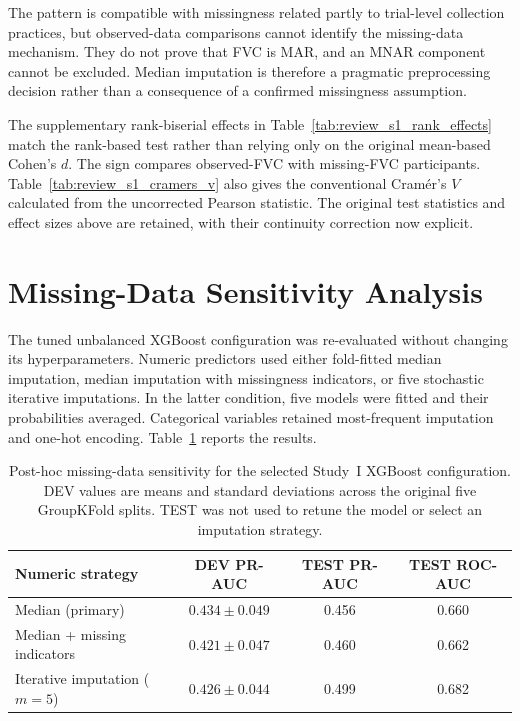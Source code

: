 The pattern is compatible with missingness related partly to trial-level collection practices, but observed-data comparisons cannot identify the missing-data mechanism. They do not prove that FVC is \gls{MAR}, and an \gls{MNAR} component cannot be excluded. Median imputation is therefore a pragmatic preprocessing decision rather than a consequence of a confirmed missingness assumption.

The supplementary rank-biserial effects in Table~\ref{tab:review_s1_rank_effects} match the rank-based test rather than relying only on the original mean-based Cohen's $d$. The sign compares observed-FVC with missing-FVC participants. Table~\ref{tab:review_s1_cramers_v} also gives the conventional Cram\'er's $V$ calculated from the uncorrected Pearson statistic. The original test statistics and effect sizes above are retained, with their continuity correction now explicit.





\section{Missing-Data Sensitivity Analysis}
\label{app:study1_missing_sensitivity}

The tuned unbalanced XGBoost configuration was re-evaluated without changing its hyperparameters. Numeric predictors used either fold-fitted median imputation, median imputation with missingness indicators, or five stochastic iterative imputations. In the latter condition, five models were fitted and their probabilities averaged. Categorical variables retained most-frequent imputation and one-hot encoding. Table~\ref{tab:study1_missing_sensitivity} reports the results.

\begin{table}[ht!]
\centering
\caption[Study I missing-data sensitivity]{Post-hoc missing-data sensitivity for the selected Study~I XGBoost configuration. DEV values are means and standard deviations across the original five GroupKFold splits. TEST was not used to retune the model or select an imputation strategy.}
\label{tab:study1_missing_sensitivity}
\small
\begin{tabular}{lccc}
\toprule
\textbf{Numeric strategy} & \textbf{DEV PR-AUC} & \textbf{TEST PR-AUC} & \textbf{TEST ROC-AUC} \\
\midrule
Median (primary)             & $0.434\pm0.049$ & 0.456 & 0.660 \\
Median + missing indicators & $0.421\pm0.047$ & 0.460 & 0.662 \\
Iterative imputation ($m=5$)& $0.426\pm0.044$ & 0.499 & 0.682 \\
\bottomrule
\end{tabular}
\end{table}

